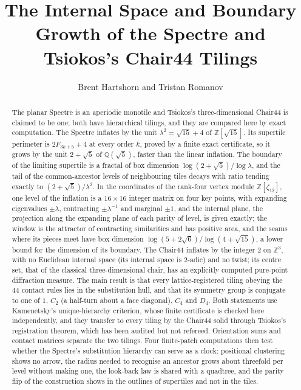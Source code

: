 \documentclass[11pt]{article}
\title{The Internal Space and Boundary Growth of the Spectre and Tsiokos's Chair44 Tilings}
\author{Brent Hartshorn \orcidlink{0009-0004-2853-655X}
        and Tristan Romanov}
\theoremstyle{definition}
\theoremstyle{remark}
\newcommand{\lam}{\lambda}
\begin{document}
\maketitle


\begin{abstract}
The planar Spectre is an aperiodic monotile and Tsiokos's three-dimensional Chair44 is claimed to be one; both
have hierarchical tilings, and they are compared here by exact computation.  The Spectre inflates by the unit $\lam^{2}=\sqrt{15} + 4$ of $\mathbb{Z}[\sqrt{15}]$.
Its supertile perimeter is $2F_{3k+5}+4$ at every order $k$, proved by a finite exact certificate, so it grows by
the unit $2+\sqrt5$ of $\mathbb{Q}(\sqrt5)$, faster than the linear inflation.  The boundary of the limiting supertile
is a fractal of box dimension $\log(2+\sqrt5)/\log\lam$, and the tail of the common-ancestor levels of neighbouring
tiles decays with ratio tending exactly to $(2+\sqrt5)/\lam^{2}$.  In the coordinates of the rank-four
vertex module $\mathbb{Z}[\zeta_{12}]$, one level of the inflation is a $16\times16$ integer matrix on four key points, with
expanding eigenvalues $\pm\lam$, contracting $\pm\lam^{-1}$ and marginal $\pm1$, and the internal plane, the projection
along the expanding plane of each parity of level, is given exactly; the window is the attractor of contracting similarities and has positive area, and the seams where its pieces
meet have box dimension $\log(5+2\sqrt6)/\log(4+\sqrt{15})$, a lower bound for the dimension of its boundary.  The Chair44 inflates by the integer $2$ on $\mathbb{Z}^{3}$, with no Euclidean internal space (its internal
space is $2$-adic) and no twist; its centre set, that of the classical three-dimensional chair, has an explicitly computed
pure-point diffraction measure.  The main result is that every lattice-registered tiling obeying the $44$ contact rules
lies in the substitution hull, and that its symmetry group is conjugate to one of $1$, $C_{2}$ (a half-turn about a face
diagonal), $C_{4}$ and $D_{4}$.  Both statements use Kamenetsky's unique-hierarchy criterion, whose finite certificate
is checked here independently, and they transfer to every tiling by the Chair44 solid through Tsiokos's registration
theorem, which has been audited but not refereed.  Orientation
sums and contact matrices separate the two tilings.  Four finite-patch
computations then test whether the Spectre's substitution hierarchy can serve as a clock: positional clustering shows no
arrow, the radius needed to recognise an ancestor grows about threefold per level without making one, the look-back
law is shared with a quadtree, and the parity flip of the construction shows in the outlines of supertiles and not in the
tiles.
\end{abstract}
\end{document}
